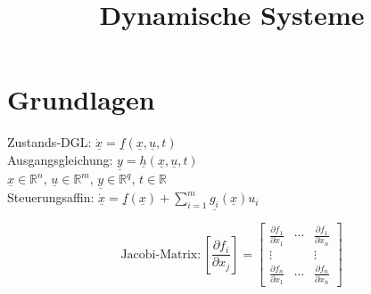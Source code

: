 \documentclass[german]{latex4ei/latex4ei_sheet}
\title{Dynamische Systeme}
\begin{document}
\ifdefined\GitRevision{}\fi

\maketitle

\section{Grundlagen}
\begin{sectionbox}
Zustands-DGL: $\underline{\dot{x}} =  \underline{f}\left( \underline{x}, \underline{u}, t \right) $ \\
Ausgangsgleichung: $\underline{y} = \underline{h} \left( \underline{x}, \underline{u}, t \right)$ \\
$\underline{x} \in \mathbb{R}^n$, $\underline{u} \in \mathbb{R}^m$, $\underline{y} \in \mathbb{R}^q$, $t \in \mathbb{R}$\\

Steuerungsaffin: $\underline{\dot{x}} = \underline{f}(\underline{x}) + \sum_{i=1}^{m} \underline{g_i}(\underline{x}) u_i$

\begin{equation*}
\text{Jacobi-Matrix:} \,
\left[ \frac{\partial f_i}{\partial x_j} \right] =
\begin{bmatrix}
  \frac{\partial f_1}{\partial x_1} &   \cdots  &   \frac{\partial f_1}{\partial x_n} \\
  \vdots                            &           &   \vdots \\
  \frac{\partial f_n}{\partial x_1} &   \cdots  &   \frac{\partial f_n}{\partial x_n}
\end{bmatrix}
\end{equation*}
\end{sectionbox}
\end{document}
